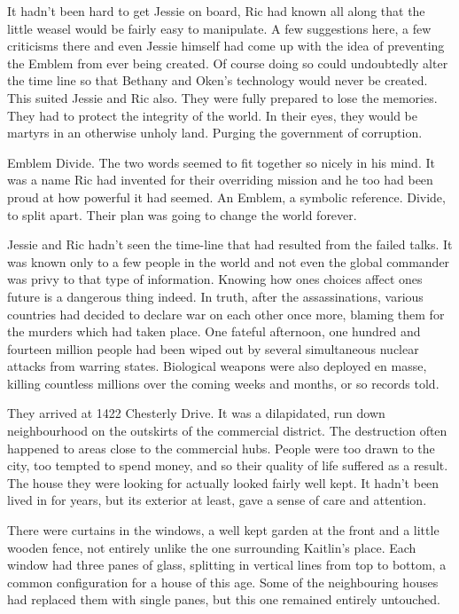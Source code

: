 It hadn't been hard to get Jessie on board, Ric had known all along that the little weasel would be fairly easy to manipulate.  A few suggestions here, a few criticisms there and even Jessie himself had come up with the idea of preventing the Emblem from ever being created.  Of course doing so could undoubtedly alter the time line so that Bethany and Oken's technology would never be created.  This suited Jessie and Ric also.  They were fully prepared to lose the memories.  They had to protect the integrity of the world.  In their eyes, they would be martyrs in an otherwise unholy land.  Purging the government of corruption.

Emblem Divide.  The two words seemed to fit together so nicely in his mind.  It was a name Ric had invented for their overriding mission and he too had been proud at how powerful it had seemed.  An Emblem, a symbolic reference.  Divide, to split apart.  Their plan was going to change the world forever.

Jessie and Ric hadn't seen the time-line that had resulted from the failed talks.  It was known only to a few people in the world and not even the global commander was privy to that type of information.  Knowing how ones choices affect ones future is a dangerous thing indeed.  In truth, after the assassinations, various countries had decided to declare war on each other once more, blaming them for the murders which had taken place.  One fateful afternoon, one hundred and fourteen million people had been wiped out by several simultaneous nuclear attacks from warring states.  Biological weapons were also deployed en masse, killing countless millions over the coming weeks and months, or so records told.

They arrived at 1422 Chesterly Drive.  It was a dilapidated, run down neighbourhood on the outskirts of the commercial district.  The destruction often happened to areas close to the commercial hubs.  People were too drawn to the city, too tempted to spend money, and so their quality of life suffered as a result.  The house they were looking for actually looked fairly well kept.  It hadn't been lived in for years, but its exterior at least, gave a sense of care and attention.

There were curtains in the windows, a well kept garden at the front and a little wooden fence, not entirely unlike the one surrounding Kaitlin's place.  Each window had three panes of glass, splitting in vertical lines from top to bottom, a common configuration for a house of this age.  Some of the neighbouring houses had replaced them with single panes, but this one remained entirely untouched.

